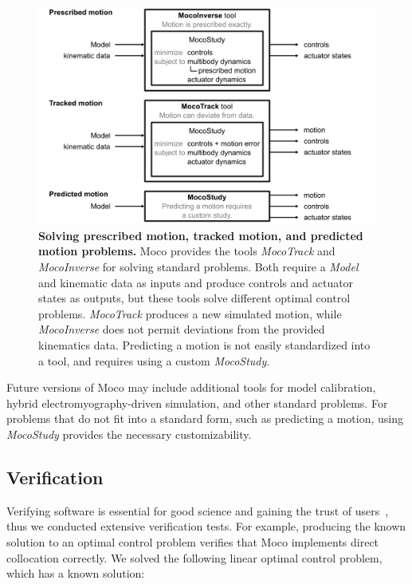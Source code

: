 \documentclass[10pt,letterpaper]{article}
\begin{document}
\begin{figure}[!h]
    \centering
    \includegraphics{../figures/MocoToolDiagram.png}
    \caption{{\bf Solving prescribed motion, tracked motion, and predicted motion problems.}
Moco provides the tools \textit{MocoTrack} and \textit{MocoInverse} for solving standard problems. Both require a \textit{Model} and kinematic data as inputs and produce controls and actuator states as outputs, but these tools solve different optimal control problems. \textit{MocoTrack} produces a new simulated motion, while \textit{MocoInverse} does not permit deviations from the provided kinematics data. Predicting a motion is not easily standardized into a tool, and requires using a custom \textit{MocoStudy}.    }
    \label{mocotooldiagram}
\end{figure}

Future versions of Moco may include additional tools for model calibration, hybrid electromyography-driven simulation, and other standard problems. For problems that do not fit into a standard form, such as predicting a motion, using \textit{MocoStudy} provides the necessary customizability.

\subsection*{Verification}

Verifying software is essential for good science and gaining the trust of users~\cite{Hicks:2015bo}, thus we conducted extensive verification tests. For example, producing the known solution to an optimal control problem verifies that Moco implements direct collocation correctly. We solved the following linear optimal control problem, which has a known solution:
\end{document}

